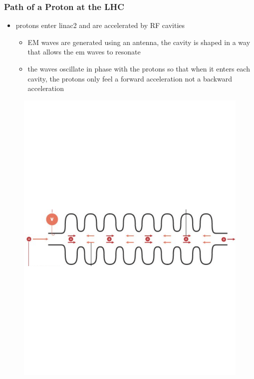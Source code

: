 \documentclass[
	11pt, %
]{beamer}
\begin{document}
\begin{frame}
	\frametitle{Path of a Proton at the LHC}
	
\begin{itemize}
	\item protons enter linac2 and are accelerated by RF cavities
	\begin{itemize}
		\item EM waves are generated using an antenna, the cavity is shaped in a way that allows the em 			waves to resonate
		\item the waves oscillate in phase with the protons so that when it enters each cavity, the protons only 		feel a forward acceleration not a backward acceleration
	\end{itemize}
\end{itemize}

\begin{figure}
	\vspace*{-3.3cm}
	 \hspace*{0cm}
	\includegraphics[scale=.3]{rf_cavity.pdf}
\end{figure}


\end{frame}
\end{document}

